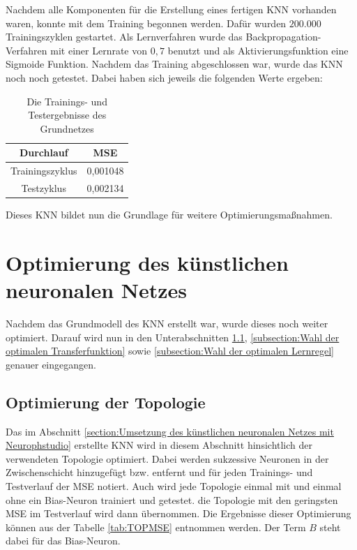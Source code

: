 Nachdem alle Komponenten für die Erstellung eines fertigen KNN vorhanden waren, konnte mit dem Training begonnen werden. Dafür wurden $200.000$ Trainingszyklen gestartet. Als Lernverfahren wurde das Backpropagation-Verfahren mit einer Lernrate von $0,7$ benutzt und als Aktivierungsfunktion eine Sigmoide Funktion. Nachdem das Training abgeschlossen war, wurde das KNN noch noch getestet. Dabei haben sich jeweils die folgenden Werte ergeben:

\begin{table}[H]
\centering
\begin{tabular}{|c|c|}
\hline 
\textbf{Durchlauf} & \textbf{MSE} \\ 
\hline 
Trainingszyklus & 0,001048 \\ 
\hline  
Testzyklus & 0,002134  \\ 
\hline 
\end{tabular} 
\label{tab:ERGGrundnetz}
\caption{Die Trainings- und Testergebnisse des Grundnetzes}
\end{table}

Dieses KNN bildet nun die Grundlage für weitere Optimierungsmaßnahmen.

\section{Optimierung des künstlichen neuronalen Netzes}
\label{section:Optimierung des künstlischen neuronalen Netzes}

Nachdem das Grundmodell des KNN erstellt war, wurde dieses noch weiter optimiert. Darauf wird nun in den Unterabschnitten \ref{subsection:Optimierung der Topologie}, \ref{subsection:Wahl der optimalen Transferfunktion} sowie \ref{subsection:Wahl der optimalen Lernregel} genauer eingegangen. 

\subsection{Optimierung der Topologie}
\label{subsection:Optimierung der Topologie}

Das im Abschnitt \ref{section:Umsetzung des künstlichen neuronalen Netzes mit Neurophstudio} erstellte KNN wird in diesem Abschnitt hinsichtlich der verwendeten Topologie optimiert. Dabei werden sukzessive Neuronen in der Zwischenschicht hinzugefügt bzw. entfernt und für jeden Trainings- und Testverlauf der MSE notiert. Auch wird jede Topologie einmal mit und einmal ohne ein Bias-Neuron trainiert und getestet. die Topologie mit den geringsten MSE im Testverlauf wird dann übernommen. Die Ergebnisse dieser Optimierung können aus der Tabelle \ref{tab:TOPMSE} entnommen werden. Der Term $B$ steht dabei für das Bias-Neuron.


